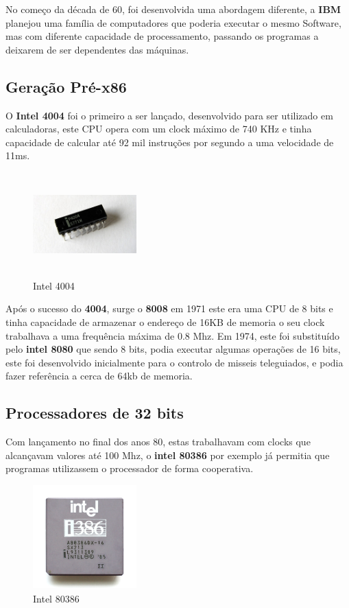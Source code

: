 \documentclass{report}
\begin{document}
No começo da década de 60, foi desenvolvida uma abordagem diferente, a \textbf{IBM} planejou uma família de computadores que poderia executar o mesmo Software, mas com diferente capacidade de processamento, passando os programas a deixarem de ser dependentes das máquinas.

\subsection{Geração Pré-x86}
\label{sect.Geração Pré-x86}

O \textbf{Intel 4004} foi o primeiro a ser lançado, desenvolvido para ser utilizado em calculadoras, este \ac{CPU} opera com um clock máximo de 740 KHz e tinha capacidade de calcular até 92 mil instruções por segundo a uma velocidade de 11ms.

\begin{figure}
\center
\includegraphics[width=4cm, height=4cm]{Imagens/intel4004.jpg}
\caption{Intel 4004}
\end{figure} 

Após o sucesso do \textbf{4004}, surge o \textbf{8008} em 1971 este era uma \ac{CPU} de 8 bits e tinha capacidade de armazenar o endereço de 16KB de memoria o seu clock trabalhava a uma frequência máxima de 0.8 Mhz.
Em 1974, este foi substituído pelo \textbf{intel 8080} que sendo 8 bits, podia executar algumas operações de 16 bits, este foi desenvolvido inicialmente para o controlo de misseis teleguiados, e podia fazer referência a cerca de 64kb de memoria.

\subsection{Processadores de 32 bits}
\label{sect.Processadores de 32 bits}

Com lançamento no final dos anos 80, estas trabalhavam com clocks que alcançavam valores até 100 Mhz, o \textbf{intel 80386} por exemplo já permitia que programas utilizassem o processador de forma cooperativa.

\begin{figure}
\center
\includegraphics[width=4cm, height=4cm]{Imagens/intel80386.jpg}
\caption{Intel 80386}
\end{figure} 
\end{document}
